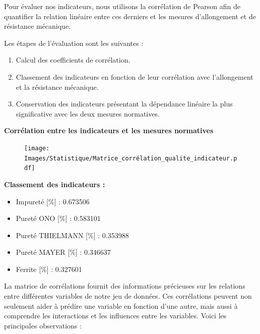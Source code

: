 \documentclass[12pt]{article}
\begin{document}
    






Pour évaluer nos indicateurs, nous utilisons la corrélation de Pearson afin de quantifier la relation linéaire entre ces derniers et les mesures d'allongement et de résistance mécanique.

\vspace{10pt}
Les étapes de l'évaluation sont les suivantes :
\vspace{5pt}

\begin{enumerate}
\item Calcul des coefficients de corrélation.
\item Classement des indicateurs en fonction de leur corrélation avec l'allongement et la résistance mécanique.
\item Conservation des indicateurs présentant la dépendance linéaire la plus significative avec les deux mesures normatives.
\end{enumerate}




\textbf{Corrélation entre les indicateurs et les mesures normatives} 
\begin{figure}[H]
    \texttt{[image: Images/Statistique/Matrice\_corrélation\_qualite\_indicateur.pdf]} 
\end{figure}


\textbf{ Classement des indicateurs :}
\begin{itemize}
    \item Impureté [\%] : 0.673506
    \item Pureté ONO [\%] : 0.583101
    \item Pureté THIELMANN [\%] : 0.353988
    \item Pureté MAYER [\%] : 0.346637
    \item Ferrite [\%] : 0.327601
\end{itemize}


La matrice de corrélations fournit des informations précieuses sur les relations entre différentes variables de notre jeu de données. Ces corrélations peuvent non seulement aider à prédire une variable en fonction d'une autre, mais aussi à comprendre les interactions et les influences entre les variables. Voici les principales observations :
\end{document}
